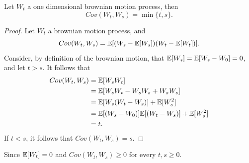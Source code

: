 \documentclass[../TGMAFFIRO]{subfiles}
\begin{document}
\begin{proposition}\label{prop:cov_brownian_motion}
Let $W_t$ a one dimensional brownian motion process, then
\[
	Cov(W_t, W_s) = \min\{t, s\}.
\]
\end{proposition}

\begin{proof}
Let $W_t$ a brownian motion process, and
\begin{equation}
	Cov(W_t, W_s) = \mathbb{E}[(W_s - \mathbb{E}[W_s])(W_t - \mathbb{E}[W_t])].
\end{equation}
Consider, by definition of the brownian motion, that $\mathbb{E}[W_s] = \mathbb{E}[W_s - W_0] = 0$, and let $ t > s$. It follows that
\begin{align*}
	Cov(W_t, W_s) &= \mathbb{E}[W_sW_t] \\
				  &= \mathbb{E}[W_sW_t - W_sW_s + W_sW_s]\\
				  &= \mathbb{E}[W_s(W_t - W_s)] + \mathbb{E}[W_s^2]\\
				  &= \mathbb{E}[(W_s - W_0)]\mathbb{E}[(W_t - W_s)] + \mathbb{E}[W_s^2]\\
				  &= t.
\end{align*}
If $t < s$, it follows that $Cov(W_t, W_s) = s$.
\end{proof}

\begin{remark}
	Since $\mathbb{E}[W_t] = 0$ and $Cov(W_t, W_s) \geq 0$ for every $t, s \geq 0$.
\end{remark}
\end{document}
